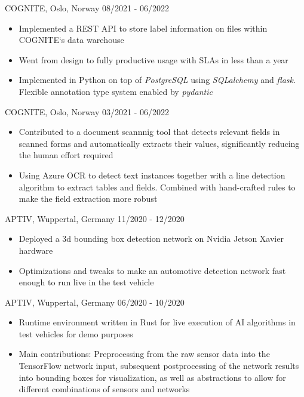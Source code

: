 \documentclass[singlesided,
               paper=a4,
               fontsize=10pt
              ]{my-resume}
\begin{document}
%
	{COGNITE, Oslo, Norway}
	{08/2021 - 06/2022}
    {\begin{itemize}[leftmargin=2em]
		\item Implemented a REST API to store label information on files within COGNITE`s data warehouse
		\item Went from design to fully productive usage with SLAs in less than a year
		\item Implemented in Python on top of \textit{PostgreSQL} using \textit{SQLalchemy} and \textit{flask}. Flexible annotation type system enabled by \textit{pydantic}
	\end{itemize}}
%
	{COGNITE, Oslo, Norway}
	{03/2021 - 06/2022}
    {\begin{itemize}[leftmargin=2em]
		\item Contributed to a document scannnig tool that detects relevant fields in scanned forms and automatically extracts their values, significantly reducing the human effort required
		\item Using Azure OCR to detect text instances together with a line detection algorithm to extract tables and fields. Combined with hand-crafted rules to make the field extraction more robust
	\end{itemize}}	
%
    {APTIV, Wuppertal, Germany}
    {11/2020 - 12/2020}
    {\begin{itemize}[leftmargin=2em]
        \item Deployed a 3d bounding box detection network on Nvidia Jetson Xavier hardware 
        \item Optimizations and tweaks to make an automotive detection network fast enough to run live in the test vehicle
    \end{itemize}}
%
    {APTIV, Wuppertal, Germany}
    {06/2020 - 10/2020}
    {\begin{itemize}[leftmargin=2em]
        \item Runtime environment written in Rust for live execution of AI algorithms in test vehicles for demo purposes
        \item Main contributions: Preprocessing from the raw sensor data into the TensorFlow network input, subsequent postprocessing of the network results into bounding boxes for visualization, as well as abstractions to allow for different combinations of sensors and networks
    \end{itemize}}
\end{document}

